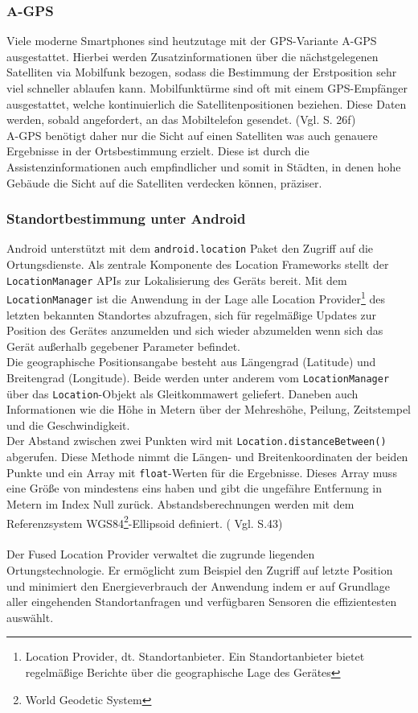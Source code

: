\subsubsection{\gls{A-GPS}}
Viele moderne \glspl{Smartphone} sind heutzutage mit der \gls{GPS}-Variante \gls{A-GPS} ausgestattet. Hierbei werden Zusatzinformationen über die nächstgelegenen Satelliten via Mobilfunk bezogen, sodass die Bestimmung der Erstposition sehr viel schneller ablaufen kann. Mobilfunktürme sind oft mit einem \gls{GPS}-Empfänger ausgestattet, welche kontinuierlich die Satellitenpositionen beziehen. Diese Daten werden, sobald angefordert, an das Mobiltelefon gesendet. (Vgl. \cite{gps} S. 26f) \\
\gls{A-GPS} benötigt daher nur die Sicht auf einen Satelliten was auch genauere Ergebnisse in der Ortsbestimmung erzielt. Diese ist durch die Assistenzinformationen auch empfindlicher und somit in Städten, in denen hohe Gebäude die Sicht auf die Satelliten verdecken können, präziser.   
\subsubsection{Standortbestimmung unter Android}
Android unterstützt mit dem \texttt{android.location} Paket den Zugriff auf die Ortungsdienste. Als zentrale Komponente des Location Frameworks stellt der \texttt{LocationManager} \glspl{API} zur Lokalisierung des Geräts bereit. Mit dem \texttt{LocationManager} ist die Anwendung in der Lage alle Location Provider\footnote{ Location Provider, dt. Standortanbieter. Ein Standortanbieter bietet regelmäßige Berichte über die geographische Lage des Gerätes} des letzten bekannten Standortes abzufragen, sich für regelmäßige Updates zur Position des Gerätes anzumelden und sich wieder abzumelden wenn sich das Gerät außerhalb gegebener Parameter befindet. \cite{android_gps} \\
Die geographische Positionsangabe besteht aus Längengrad (Latitude) und Breitengrad (Longitude). Beide werden unter anderem vom \texttt{LocationManager} über das \texttt{Location}-Objekt als Gleitkommawert geliefert. Daneben auch Informationen wie die Höhe in Metern über der Mehreshöhe, Peilung, Zeitstempel und die Geschwindigkeit.\\
Der Abstand zwischen zwei Punkten wird mit \texttt{Location.distanceBetween()} abgerufen. Diese Methode nimmt die Längen- und Breitenkoordinaten der beiden Punkte und ein Array mit \texttt{float}-Werten für die Ergebnisse. Dieses Array muss eine Größe von mindestens eins haben und gibt die ungefähre Entfernung in Metern im Index Null zurück. Abstandsberechnungen werden mit dem Referenzsystem WGS84\footnote{ World Geodetic System}-Ellipsoid definiert.
( Vgl. \cite{location} S.43) 
\\\\
Der Fused Location Provider verwaltet die zugrunde liegenden Ortungstechnologie. Er ermöglicht zum Beispiel den Zugriff auf letzte Position und minimiert den Energieverbrauch der Anwendung indem er auf Grundlage aller eingehenden Standortanfragen und verfügbaren Sensoren die effizientesten auswählt. \cite{android_fused}
\clearpage
